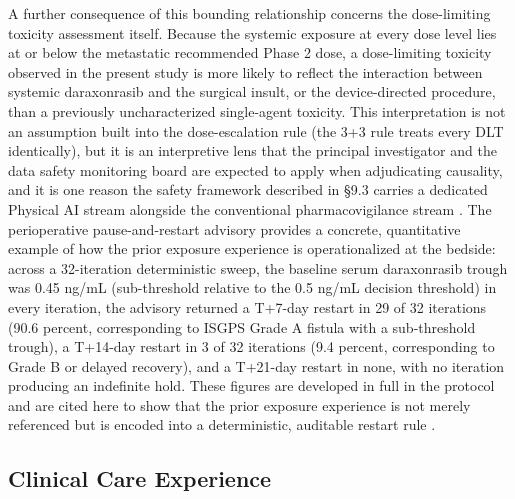 A further consequence of this bounding relationship concerns the dose-limiting
toxicity assessment itself. Because the systemic exposure at every dose level lies
at or below the metastatic recommended Phase 2 dose, a dose-limiting toxicity
observed in the present study is more likely to reflect the interaction between
systemic daraxonrasib and the surgical insult, or the device-directed procedure,
than a previously uncharacterized single-agent toxicity. This interpretation is
not an assumption built into the dose-escalation rule (the 3+3 rule treats every
DLT identically), but it is an interpretive lens that the principal investigator
and the data safety monitoring board are expected to apply when adjudicating
causality, and it is one reason the safety framework described in \S 9.3 carries a
dedicated Physical AI stream alongside the conventional pharmacovigilance stream
\cite{phase1guidance, daraxwhipple}. The perioperative pause-and-restart advisory
provides a concrete, quantitative example of how the prior exposure experience is
operationalized at the bedside: across a 32-iteration deterministic sweep, the
baseline serum daraxonrasib trough was 0.45 ng/mL (sub-threshold relative to the
0.5 ng/mL decision threshold) in every iteration, the advisory returned a T+7-day
restart in 29 of 32 iterations (90.6 percent, corresponding to ISGPS Grade A
fistula with a sub-threshold trough), a T+14-day restart in 3 of 32 iterations
(9.4 percent, corresponding to Grade B or delayed recovery), and a T+21-day
restart in none, with no iteration producing an indefinite hold. These figures are
developed in full in the protocol and are cited here to show that the prior
exposure experience is not merely referenced but is encoded into a deterministic,
auditable restart rule \cite{onpremwhippl, daraxwhipple}.

\subsection{Clinical Care Experience}

